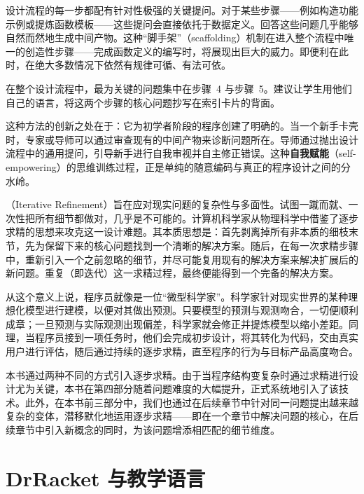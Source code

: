 设计流程的每一步都配有针对性极强的关键提问。对于某些步骤——例如构造功能示例或提炼函数模板——这些提问会直接依托于数据定义。回答这些问题几乎能够自然而然地生成中间产物。这种“脚手架”（scaffolding）机制在进入整个流程中唯一的创造性步骤——完成函数定义的编写时，将展现出巨大的威力。即便利在此时，在绝大多数情况下依然有规律可循、有法可依。

\begin{notebox}[教师建议]
在整个设计流程中，最为关键的问题集中在步骤~4 与步骤~5。建议让学生用他们自己的语言，将这两个步骤的核心问题抄写在索引卡片的背面。
\end{notebox}

这种方法的创新之处在于：它为初学者阶段的程序创建了明确的。当一个新手卡壳时，专家或导师可以通过审查现有的中间产物来诊断问题所在。导师通过抛出设计流程中的通用提问，引导新手进行自我审视并自主修正错误。这种\textbf{自我赋能}（self-empowering）的思维训练过程，正是单纯的随意编码与真正的程序设计之间的分水岭。

（Iterative Refinement）旨在应对现实问题的复杂性与多面性。试图一蹴而就、一次性把所有细节都做对，几乎是不可能的。计算机科学家从物理科学中借鉴了逐步求精的思想来攻克这一设计难题。其本质思想是：首先剥离掉所有非本质的细枝末节，先为保留下来的核心问题找到一个清晰的解决方案。随后，在每一次求精步骤中，重新引入一个之前忽略的细节，并尽可能复用现有的解决方案来解决扩展后的新问题。重复（即迭代）这一求精过程，最终便能得到一个完备的解决方案。

从这个意义上说，程序员就像是一位“微型科学家”。科学家针对现实世界的某种理想化模型进行建模，以便对其做出预测。只要模型的预测与观测吻合，一切便顺利成章；一旦预测与实际观测出现偏差，科学家就会修正并提炼模型以缩小差距。同理，当程序员接到一项任务时，他们会完成初步设计，将其转化为代码，交由真实用户进行评估，随后通过持续的逐步求精，直至程序的行为与目标产品高度吻合。

本书通过两种不同的方式引入逐步求精。由于当程序结构变复杂时通过求精进行设计尤为关键，本书在第四部分随着问题难度的大幅提升，正式系统地引入了该技术。此外，在本书前三部分中，我们也通过在后续章节中针对同一问题提出越来越复杂的变体，潜移默化地运用逐步求精——即在一个章节中解决问题的核心，在后续章节中引入新概念的同时，为该问题增添相匹配的细节维度。


\section*{DrRacket 与教学语言}
\label{sec:preface:drracket_languages}

